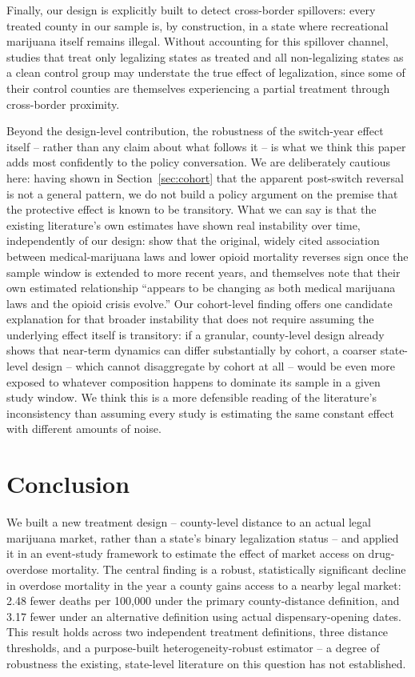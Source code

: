 \documentclass{article}
\begin{document}
Finally, our design is explicitly built to detect cross-border spillovers: every treated county in our sample is,
by construction, in a state where recreational marijuana itself remains illegal. Without accounting for this
spillover channel, studies that treat only legalizing states as treated and all non-legalizing states as a clean
control group may understate the true effect of legalization, since some of their control counties are themselves
experiencing a partial treatment through cross-border proximity.

Beyond the design-level contribution, the robustness of the switch-year effect itself -- rather than any claim
about what follows it -- is what we think this paper adds most confidently to the policy conversation. We are
deliberately cautious here: having shown in Section~\ref{sec:cohort} that the apparent post-switch reversal is not
a general pattern, we do not build a policy argument on the premise that the protective effect is known to be
transitory. What we can say is that the existing literature's own estimates have shown real instability over time,
independently of our design: \citet{Shover2019} show that the original, widely cited association between
medical-marijuana laws and lower opioid mortality \citep{Bachhuber2014} reverses sign once the sample window is
extended to more recent years, and \citet{PowellPaculaJacobson2018} themselves note that their own estimated
relationship ``appears to be changing as both medical marijuana laws and the opioid crisis evolve.'' Our
cohort-level finding offers one candidate explanation for that broader instability that does not require assuming
the underlying effect itself is transitory: if a granular, county-level design already shows that near-term
dynamics can differ substantially by cohort, a coarser state-level design -- which cannot disaggregate by cohort at
all -- would be even more exposed to whatever composition happens to dominate its sample in a given study window.
We think this is a more defensible reading of the literature's inconsistency than assuming every study is
estimating the same constant effect with different amounts of noise.

\section{Conclusion}

We built a new treatment design -- county-level distance to an actual legal marijuana market, rather than a
state's binary legalization status -- and applied it in an event-study framework to estimate the effect of
market access on drug-overdose mortality. The central finding is a robust, statistically significant decline in
overdose mortality in the year a county gains access to a nearby legal market: 2.48 fewer deaths per 100{,}000
under the primary county-distance definition, and 3.17 fewer under an alternative definition using actual
dispensary-opening dates. This result holds across two independent treatment definitions, three distance
thresholds, and a purpose-built heterogeneity-robust estimator \citep{CallawaySantAnna2021} -- a degree of
robustness the existing, state-level literature on this question has not established.
\end{document}
